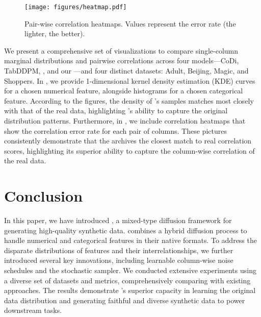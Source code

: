 \begin{wrapfigure}[18]{r}{0.5\textwidth}
\vspace{-20pt}
\begin{center}
   \centering
    \texttt{[image: figures/heatmap.pdf]}
    \caption{Pair-wise correlation heatmaps. Values represent the error rate (the lighter, the better).}
    \label{fig:heatmap}
\end{center}
\vspace{-5pt}
\end{wrapfigure}

We present a comprehensive set of visualizations to compare single-column marginal distributions and pairwise correlations across four models---CoDi, TabDDPM, \tabsyn, and our \method---and four distinct datasets: Adult, Beijing, Magic, and Shoppers. In , we provide 1-dimensional kernel density estimation (KDE) curves for a chosen numerical feature, alongside histograms for a chosen categorical feature. According to the figures, the density of \method's samples matches most closely with that of the real data, highlighting \method's ability to capture the original distribution patterns. Furthermore, in , we include correlation heatmaps that show the correlation error rate for each pair of columns. These pictures consistently demonstrate that the \method archives the closest match to real correlation scores, highlighting its superior ability to capture the column-wise correlation of the real data.

\vspace{-5pt}
\section{Conclusion}
\vspace{-5pt}
In this paper, we have introduced \method, a mixed-type diffusion framework for generating high-quality synthetic data. \method combines a hybrid diffusion process to handle numerical and categorical features in their native formats. To address the disparate distributions of features and their interrelationships,  we further introduced several key innovations, including learnable column-wise noise schedules and the stochastic sampler. We conducted extensive experiments using a diverse set of datasets and metrics, comprehensively comparing \method with existing approaches. The results demonstrate \method's superior capacity in learning the original data distribution and generating faithful and diverse synthetic data to power downstream tasks.


